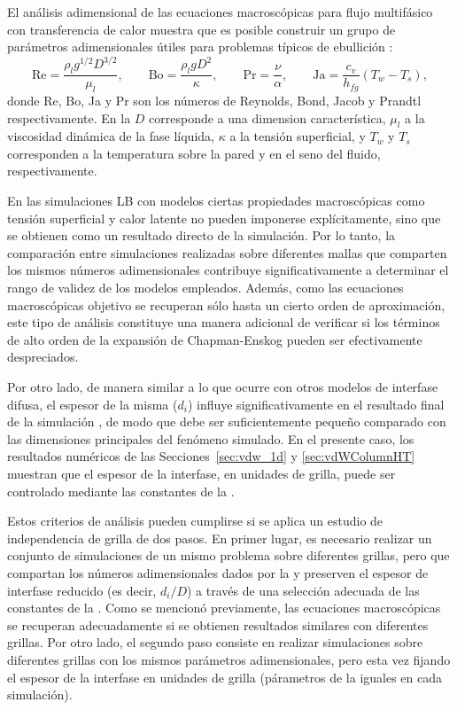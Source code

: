 El an\'alisis adimensional de las ecuaciones macrosc\'opicas para flujo multif\'asico con transferencia de calor muestra que es posible construir un grupo de par\'ametros adimensionales \'utiles para problemas t\'ipicos de ebullici\'on \cite{ajaev_modeling_2006, hua_numerical_2007}:
\begin{equation}
	\mbox{Re} = \dfrac{\rho_l g^{1/2} D^{3/2}}{\mu_l}, \qquad
	\mbox{Bo} = \dfrac{\rho_l g D^2}{\kappa}, \qquad
	\mbox{Pr} = \dfrac{\nu}{\alpha}, \qquad
	\mbox{Ja} = \dfrac{c_v}{h_{fg}}(T_w-T_s),
	\label{eq:num_adim_hetb}
\end{equation}
donde Re, Bo, Ja y Pr son los n\'umeros de Reynolds, Bond, Jacob y Prandtl respectivamente. En la  $D$ corresponde a una dimension caracter\'istica, $\mu_l$ a la viscosidad din\'amica de la fase l\'iquida, $\kappa$ a la tensi\'on superficial, y $T_w$ y $T_s$ corresponden a la temperatura sobre la pared y en el seno del fluido, respectivamente. 

En las simulaciones LB con modelos \pp{} ciertas propiedades macrosc\'opicas como tensi\'on superficial y calor latente no pueden imponerse expl\'icitamente, sino que se obtienen como un resultado directo de la simulaci\'on. Por lo tanto, la comparaci\'on entre simulaciones realizadas sobre diferentes mallas que comparten los mismos n\'umeros adimensionales contribuye significativamente a determinar el rango de validez de los modelos empleados. Adem\'as, como las ecuaciones macrosc\'opicas objetivo se recuperan s\'olo hasta un cierto orden de aproximaci\'on, este tipo de an\'alisis constituye una manera adicional de verificar si los t\'erminos de alto orden de la expansi\'on de Chapman-Enskog pueden ser efectivamente despreciados.

Por otro lado, de manera similar a lo que ocurre con otros modelos de interfase difusa, el espesor de la misma ($d_i$) influye significativamente en el resultado final de la simulaci\'on \cite{ding_diffuse_2007}, de modo que debe ser suficientemente peque\~no comparado con las dimensiones principales del fen\'omeno simulado. En el presente caso, los resultados num\'ericos de las Secciones~\ref{sec:vdw_1d} y \ref{sec:vdWColumnHT} muestran que el espesor de la interfase, en unidades de grilla, puede ser controlado mediante las constantes de la \eos{}. 

Estos criterios de an\'alisis pueden cumplirse si se aplica un estudio de independencia de grilla de dos pasos. En primer lugar, es necesario realizar un conjunto de simulaciones de un mismo problema sobre diferentes grillas, pero que compartan los n\'umeros adimensionales dados por la  y preserven el espesor de interfase reducido (es decir, $d_i/D$) a trav\'es de una selecci\'on adecuada de las constantes de la \eos{}. Como se mencion\'o previamente, las ecuaciones macrosc\'opicas se recuperan adecuadamente si se obtienen resultados similares con diferentes grillas. Por otro lado, el segundo paso consiste en realizar simulaciones sobre diferentes grillas con los mismos par\'ametros adimensionales, pero esta vez fijando el espesor de la interfase en unidades de grilla (p\'arametros de la \eos{} iguales en cada simulaci\'on). \newline

